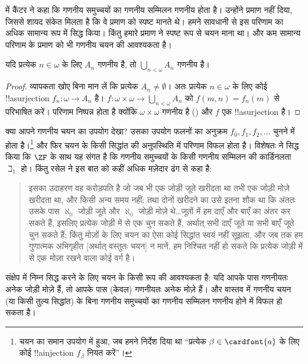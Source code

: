 \documentclass[../../../include/open-logic-section]{subfiles}
\begin{document}
\begin{ex} 
\citeyear{Cantor1878} में कैंटर ने कहा कि गणनीय समुच्चयों का गणनीय सम्मिलन
गणनीय होता है। उन्होंने प्रमाण नहीं दिया, जिससे शायद संकेत मिलता है कि वे
प्रमाण को स्पष्ट मानते थे। हमने सावधानी से इस परिणाम का अधिक सामान्य रूप
 में सिद्ध किया। किंतु
हमारे प्रमाण ने स्पष्ट रूप से चयन माना था। और कम सामान्य परिणाम के प्रमाण
को भी गणनीय चयन की आवश्यकता है।

\begin{thm}
यदि प्रत्येक $n\in\omega$ के लिए $A_n$ गणनीय है, तो
$\bigcup_{n<\omega}A_n$ गणनीय है।
\end{thm}

\begin{proof}
व्यापकता खोए बिना मान लें कि प्रत्येक $A_n\neq\emptyset$। अतः प्रत्येक
$n\in\omega$ के लिए कोई !!a{surjection} $f_n\colon\omega\to A_n$ है।
$f\colon\omega\times\omega\to\bigcup_{n<\omega}A_n$ को
$f(m,n)=f_n(m)$ से परिभाषित करें। परिणाम निष्पन्न होता है क्योंकि
$\omega\times\omega$ गणनीय है
() और $f$ एक
!!a{surjection} है।
\end{proof}
\noindent 
क्या आपने गणनीय चयन का उपयोग देखा? उसका उपयोग फलनों का अनुक्रम
$f_0,f_1,f_2,\dots$ चुनने में होता है।\footnote{चयन का समान उपयोग
 में हुआ, जब हमने निर्देश
दिया था ``प्रत्येक $\beta\in\cardfont{a}$ के लिए कोई !!a{injection}
$f_\beta$ नियत करें''।} और फिर चयन के किसी सिद्धांत की अनुपस्थिति में परिणाम
विफल होता है। विशेषतः \citet{FefermanLevy1963} ने सिद्ध किया कि $\ZF$ के
साथ यह संगत है कि गणनीय समुच्चयों के किसी गणनीय सम्मिलन की कार्डिनलता
$\beth_1$ हो। किंतु रसेल ने इस बात को कहीं अधिक मज़ेदार ढंग से कहा है:
\begin{quote}
  इसका उदाहरण वह करोड़पति है जो जब भी एक जोड़ी जूते खरीदता था तभी एक जोड़ी
  मोज़े खरीदता था, और किसी अन्य समय नहीं; तथा दोनों खरीदने का उसे इतना शौक
  था कि अंततः उसके पास $\aleph_0$ जोड़ी जूते और $\aleph_0$ जोड़ी मोज़े
  थे\dots\@ जूतों में हम दाएँ और बाएँ का अंतर कर सकते हैं, इसलिए प्रत्येक
  जोड़ी में से एक चुन सकते हैं, अर्थात् सभी दाएँ जूते या सभी बाएँ जूते चुन
  सकते हैं; किंतु मोज़ों के लिए चयन का ऐसा कोई सिद्धांत स्वयं नहीं सूझता,
  और जब तक हम गुणात्मक अभिगृहीत [अर्थात् वस्तुतः चयन] न मानें, हम निश्चित
  नहीं हो सकते कि प्रत्येक जोड़ी में से एक मोज़ा रखने वाला कोई वर्ग है।
  \citep[p.~126]{Russell1919}
\end{quote}
संक्षेप में निम्न सिद्ध करने के लिए चयन के किसी रूप की आवश्यकता है: यदि
आपके पास गणनीयतः अनेक जोड़ी मोज़े हैं, तो आपके पास (केवल) गणनीयतः अनेक
मोज़े हैं। और वास्तव में गणनीय चयन (या किसी तुल्य सिद्धांत) के बिना गणनीय
समुच्चयों का गणनीय सम्मिलन गणनीय होने में विफल हो सकता है।
\end{ex}
\end{document}
